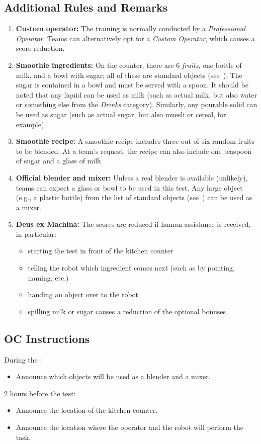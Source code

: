 \subsection*{Additional Rules and Remarks}
\begin{enumerate}
	\item \textbf{Custom operator:} The training is normally conducted by a \emph{Professional Operator}.
	Teams can alternatively opt for a \emph{Custom Operator}, which causes a score reduction.
	\item \textbf{Smoothie ingredients:} On the counter, there are 6 \emph{fruits}, one bottle of milk, and a bowl with sugar; all of these are standard objects (see~).
	The sugar is contained in a bowl and must be served with a spoon.
	It should be noted that any liquid can be used as milk (such as actual milk, but also water or something else from the \emph{Drinks} category).
	Similarly, any pourable solid can be used as sugar (such as actual sugar, but also muesli or cereal, for example).
	\item \textbf{Smoothie recipe:} A smoothie recipe includes three out of six random fruits to be blended.
	At a team's request, the recipe can also include one teaspoon of sugar and a glass of milk.
	\item \textbf{Official blender and mixer:} Unless a real blender is available (unlikely), teams can expect a glass or bowl to be used in this test.
	Any large object (e.g., a plastic bottle) from the list of standard objects (see~) can be used as a mixer.
	\item \textbf{Deus ex Machina:} The scores are reduced if human assistance is received, in particular:
	\begin{itemize}[nosep]
		\item starting the test in front of the kitchen counter
		\item telling the robot which ingredient comes next (such as by pointing, naming, etc.)
		\item handing an object over to the robot
		\item spilling milk or sugar causes a reduction of the optional bonuses
	\end{itemize}
\end{enumerate}

\subsection*{OC Instructions}
During the \SetupDays:
\begin{itemize}
	\item Announce which objects will be used as a blender and a mixer.
\end{itemize}
2 hours before the test:
\begin{itemize}
	\item Announce the location of the kitchen counter.
	\item Announce the location where the operator and the robot will perform the task.
\end{itemize}

